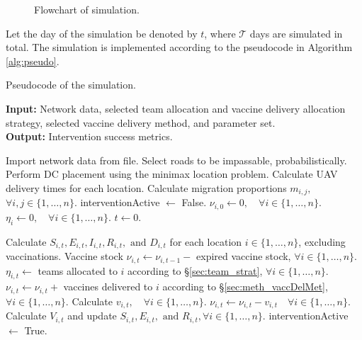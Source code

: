 \begin{figure}[ht!]{\textwidth}
    \centering
    \resizebox{0.9\textwidth}{!}{}
    \caption{Flowchart of simulation.}
    \label{meth:flowchart}
\end{figure}

Let the day of the simulation be denoted by $t$, where $\mathcal{T}$ days are simulated in total. The simulation is implemented according to the pseudocode in Algorithm \ref{alg:pseudo}. 

\begin{algorithm}[ht!]
    \caption{Pseudocode of the simulation.}
    \label{alg:pseudo}
    
    \hspace*{\algorithmicindent} \textbf{Input:} Network data, selected team allocation and vaccine delivery allocation strategy, selected vaccine delivery method, and parameter set. \\
    \hspace*{\algorithmicindent} \textbf{Output:} Intervention success metrics.
    
    \begin{algorithmic}
        \STATE Import network data from file.
        \STATE Select roads to be impassable, probabilistically.
        \STATE Perform DC placement using the minimax location problem.
        \STATE Calculate UAV delivery times for each location.
        \STATE Calculate migration proportions $m_{i,j},$ $\forall{i,j} \in \{1,\dots,n\}$.
        \STATE interventionActive $\leftarrow$ False.
        \STATE $\nu_{i,0} \leftarrow 0, \quad \forall{i} \in \{1,\dots,n \}$.
        \STATE $\eta_{i} \leftarrow 0, \quad \forall{i} \in \{1,\dots,n \}$.
        \STATE $t \leftarrow 0$.
        \end{algorithmic}
        
        \begin{algorithmic}[1]
            \STATE Calculate    $S_{i,t},E_{i,t},I_{i,t},R_{i,t},\text{ and } D_{i,t}$ for each location $i \in \{1,\dots,n \}$, excluding vaccinations.
                \STATE Vaccine stock $\nu_{i,t} \leftarrow \nu_{i,t-1} -$ expired vaccine stock, $ \forall{i} \in \{1,\dots,n\}$.
                \STATE $\eta_{i,t} \leftarrow$ teams allocated to $i$ according to \S \ref{sec:team_strat}, $ \forall{i} \in \{1,\dots,n\}$.
                \STATE $\nu_{i,t} \leftarrow \nu_{i,t} + $ vaccines delivered to $i$ according to \S \ref{sec:meth_vaccDelMet}, $\forall{i} \in \{1,\dots,n\}$. 
                \STATE Calculate $v_{i,t}, \quad \forall{i} \in \{1,\dots,n\}$.
                \STATE $\nu_{i,t} \leftarrow \nu_{i,t} - v_{i,t} \quad \forall{i} \in \{1,\dots,n\}$.
                \STATE Calculate $V_{i,t}$ and update $S_{i,t},E_{i,t}, \text{ and } R_{i,t}, \forall{i} \in \{1,\dots,n\}$.
                \STATE interventionActive $\leftarrow$ True.
            \ENDIF
        \ENDFOR
        \end{algorithmic}
\end{algorithm}


